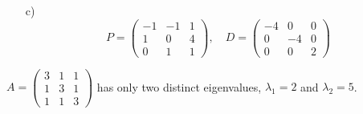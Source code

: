 {\begin{enumerate}
$$\begin{pmatrix}
        \end{pmatrix}$$ 
        A vector that is a basis for the eigenspace is $v_3 = \begin{pmatrix} 1&4&1\end{pmatrix}^T$. But any non-zero multiple is also ok. 
        \item[c)] $$P = \begin{pmatrix} -1&-1&1\\1&0&4\\0&1&1\end{pmatrix}, \quad D = \begin{pmatrix} -4&0&0\\0&-4&0\\0&0&2\end{pmatrix}$$
    \end{enumerate}
    } \fi
\fi    
\ifnum {}
   \question[3] 
$A = \begin{pmatrix}3&1&1\\1&3&1\\1&1&3 \end{pmatrix}$ has only two distinct eigenvalues, $\lambda_1 = 2$ and $\lambda_2 = 5$.   

